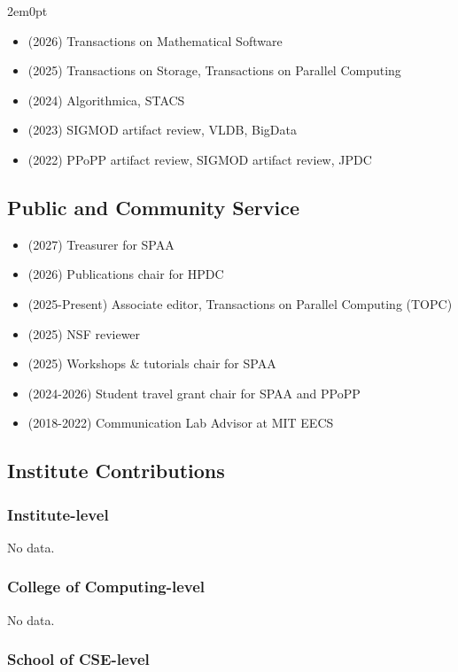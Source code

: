 \begin{adjustwidth}{2em}{0pt}
\begin{itemize}
\item (2026) Transactions on Mathematical Software
\item (2025) Transactions on Storage, Transactions on Parallel Computing
    \item (2024) Algorithmica, STACS
    \item (2023) SIGMOD artifact review, VLDB, BigData
    \item (2022) PPoPP artifact review, SIGMOD artifact review, JPDC
\end{itemize}

\subsection{Public and Community Service}

\begin{itemize}
\item (2027) Treasurer for SPAA
\item (2026) Publications chair for HPDC
\item (2025-Present) Associate editor, Transactions on Parallel Computing (TOPC)
\item (2025) NSF reviewer
 \item (2025) Workshops \& tutorials chair for SPAA
 \item (2024-2026) Student travel grant chair for SPAA and PPoPP
    \item (2018-2022) Communication Lab Advisor at MIT EECS
\end{itemize}

\iffalse
\subsection{Institute Contributions}

\subsubsection{Institute-level}

No data.

\subsubsection{College of Computing-level}
No data.

\subsubsection{School of CSE-level}


\end{adjustwidth}

